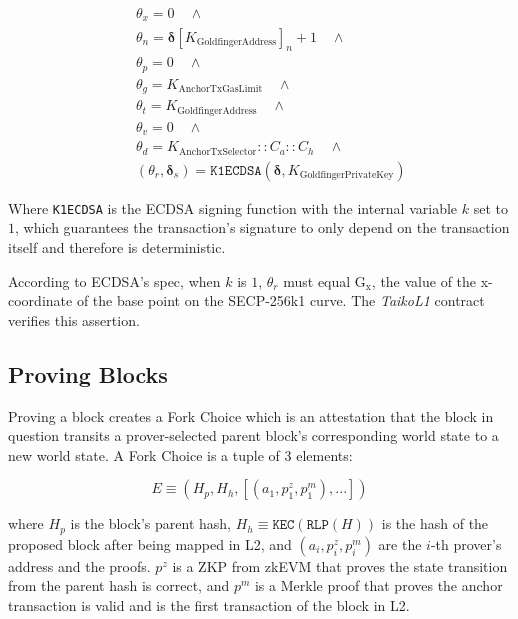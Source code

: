 \documentclass[9pt,oneside]{amsart}
\begin{document}
\begin{multicols}{2}
\begin{eqnarray}
& & \theta_x = 0 \quad \wedge \\
\nonumber& & \theta_n = \boldsymbol{\delta}[K_{\mathrm{GoldfingerAddress}}]_n + 1 \quad \wedge \\
\nonumber& & \theta_p = 0 \quad \wedge \\
\nonumber& & \theta_g = K_{\mathrm{AnchorTxGasLimit}} \quad \wedge \\
\nonumber& & \theta_t = K_{\mathrm{GoldfingerAddress}} \quad \wedge  \\
\nonumber& & \theta_v = 0 \quad \wedge  \\
\nonumber& & \theta_d = K_{\mathrm{AnchorTxSelector}}::C_a::C_h \quad \wedge  \\
\nonumber& & (\theta_r,\boldsymbol{\delta}_s) = \texttt{K1ECDSA}(\boldsymbol{\delta}, K_{\mathrm{GoldfingerPrivateKey}})
\end{eqnarray}

Where \texttt{K1ECDSA} is the ECDSA\cite{ecdsa} signing function with the internal variable $k$ set to $1$, which guarantees the transaction's signature to only depend on the transaction itself and therefore is deterministic\cite{ecdsak}.

According to ECDSA's spec, when $k$ is $1$, $\theta_r$ must equal $\mathrm{G_x}$, the value of the x-coordinate of the base point on the SECP-256k1 curve. The \textit{TaikoL1} contract verifies this assertion.


\subsection{Proving Blocks} \label{sec:proving}

Proving a block creates a Fork Choice which is an attestation that the block in question transits a prover-selected parent block's corresponding world state to a new world state. A Fork Choice is a tuple of 3 elements:

\begin{equation}
E \equiv (H_p, H_h, [(a_1, p^{z}_1, p^{m}_1),...])
\end{equation}

where $H_p$ is the block's parent hash, $H_h \equiv \texttt{KEC}(\texttt{RLP}(H))$ is the hash of the proposed block after being mapped in L2, and $(a_i, p^{z}_i, p^{m}_i)$ are the $i$-th prover's address and the proofs. $p^{z}$ is a ZKP from zkEVM that proves the state transition from the parent hash is correct, and $p^{m}$ is a Merkle proof that proves the anchor transaction is valid and is the first transaction of the block in L2.


\end{multicols}
\end{document}
